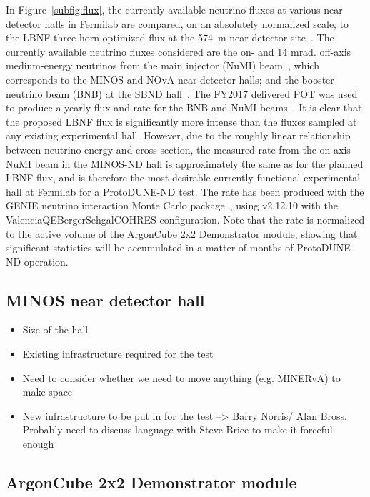 In Figure~\ref{subfig:flux}, the currently available neutrino fluxes at various near detector halls in Fermilab are compared, on an absolutely normalized scale, to the LBNF three-horn optimized flux at the 574~m near detector site~\cite{dune_opt_flux}. The currently available neutrino fluxes considered are the on- and 14 mrad. off-axis medium-energy neutrinos from the main injector (NuMI) beam~\cite{numi}, which corresponds to the MINOS and NOvA near detector halls; and the booster neutrino beam (BNB) at the SBND hall~\cite{Antonello:2015lea}. The FY2017 delivered POT was used to produce a yearly flux and rate for the BNB and NuMI beams~\cite{fnal_beam_2017}. It is clear that the proposed LBNF flux is significantly more intense than the fluxes sampled at any existing experimental hall. However, due to the roughly linear relationship between neutrino energy and cross section, the measured rate from the on-axis NuMI beam in the MINOS-ND hall is approximately the same as for the planned LBNF flux, and is therefore the most desirable currently functional experimental hall at Fermilab for a ProtoDUNE-ND test. The rate has been produced with the GENIE neutrino interaction Monte Carlo package~\cite{genie}, using v2.12.10 with the ValenciaQEBergerSehgalCOHRES configuration. Note that the rate is normalized to the active volume of the ArgonCube 2x2 Demonstrator module, showing that significant statistics will be accumulated in a matter of months of ProtoDUNE-ND operation.

\FloatBarrier
\subsection{MINOS near detector hall}
\label{sec:minos-hall}
\begin{itemize}
\item Size of the hall
\item Existing infrastructure required for the test
\item Need to consider whether we need to move anything (e.g. MINERvA) to make space
\item New infrastructure to be put in for the test --> Barry Norris/ Alan Bross. Probably need to discuss language with Steve Brice to make it forceful enough
\end{itemize}

\subsection{ArgonCube 2x2 Demonstrator module}
\label{sec:2x2-design}

